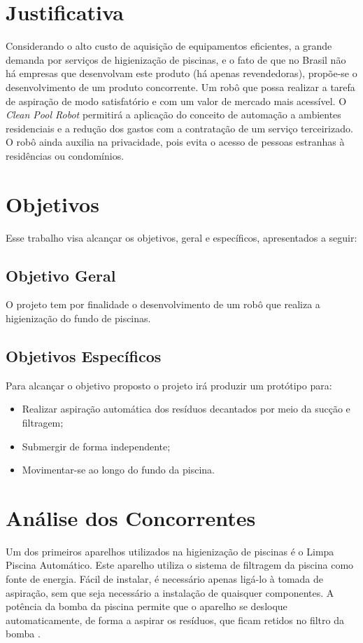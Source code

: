 \section{Justificativa}
Considerando o alto custo de aquisição de equipamentos eficientes, a grande 
demanda por serviços de higienização de piscinas, e o fato de que no Brasil não
há empresas que desenvolvam este produto (há apenas revendedoras), propõe-se o 
desenvolvimento de um produto concorrente. Um robô  que possa realizar a tarefa
de aspiração de  modo satisfatório e com um valor de mercado mais acessível. O 
\textit{Clean Pool Robot} permitirá a aplicação do conceito de automação a 
ambientes residenciais e a redução dos gastos com a contratação de um serviço 
terceirizado. O robô ainda auxilia na privacidade, pois evita o acesso de 
pessoas estranhas à residências ou condomínios. 

\section{Objetivos}
Esse trabalho visa alcançar os objetivos, geral e específicos, apresentados a 
seguir:

\subsection{Objetivo Geral}
O projeto tem por finalidade o desenvolvimento de um robô que realiza a higienização
do fundo de piscinas.

\subsection{Objetivos Específicos}
Para alcançar o objetivo proposto o projeto irá produzir um protótipo para:
\begin{itemize}
  \item Realizar aspiração automática dos resíduos decantados por meio da sucção e filtragem;
  \item Submergir de forma independente;
  \item Movimentar-se ao longo do fundo da piscina.
 
\end{itemize}

\section{Análise dos Concorrentes}
Um dos primeiros aparelhos utilizados na higienização de piscinas é o Limpa 
Piscina Automático. Este aparelho utiliza o sistema de filtragem da piscina 
como fonte de energia. Fácil de instalar, é necessário apenas ligá-lo à tomada
de aspiração, sem que seja necessário a instalação de quaisquer componentes. 
A potência da bomba da piscina permite que o aparelho se desloque 
automaticamente, de forma a aspirar os resíduos, que ficam retidos no filtro 
da bomba \cite{silva2015}.


